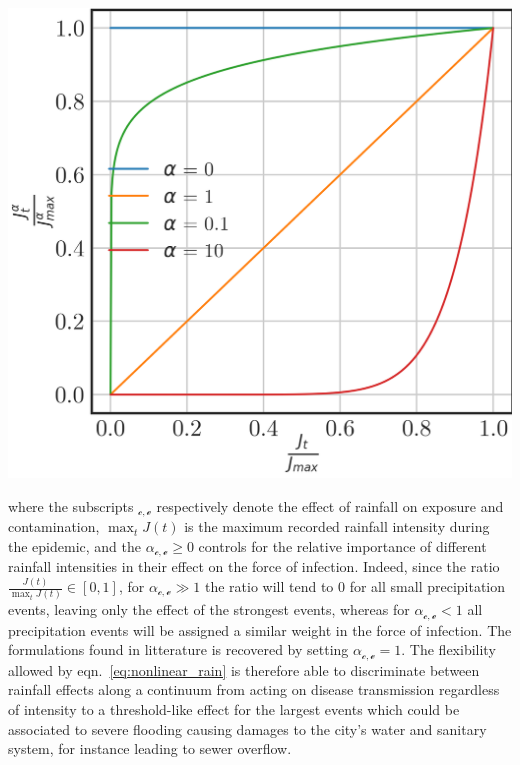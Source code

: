 \begin{marginfigure}
	\centering
	\includegraphics{fig_cholera-rainfall/alpha.png}
	\label{fig:alpha}
\end{marginfigure}
where the subscripts $_\mathcal{c,e}$ respectively denote the effect of rainfall on exposure and contamination, $\max_t J(t)$ is the maximum recorded rainfall intensity during the epidemic, and the $\alpha_{\mathcal{c,e}}\ge0$ controls for the relative importance of different rainfall intensities in their effect on the force of infection. Indeed, since the ratio $\frac{J(t)}{\max_t J(t)} \in [0,1]$, for $\alpha_{\mathcal{c,e}} \gg 1$ the ratio will tend to 0 for all small precipitation events, leaving only the effect of the strongest events, whereas for $\alpha_{\mathcal{c,e}} < 1$ all precipitation events will be assigned a similar weight in the force of infection. The formulations found in litterature is recovered by setting $\alpha_{\mathcal{c,e}} = 1$. The flexibility allowed by eqn.~\eqref{eq:nonlinear_rain} is therefore able to discriminate between rainfall effects along a continuum from acting on disease transmission regardless of intensity to a threshold-like effect for the largest events which could be associated to severe flooding causing damages to the city's water and sanitary system, for instance leading to sewer overflow.

